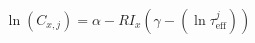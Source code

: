 \documentclass{article}
\begin{document}
\LARGE
\pagestyle{empty}
\[
\ln(C_{x,j}) = \alpha-RI_x\left(\gamma-(\ln \tau_\mathrm{eff}^j)\right)
\]
\end{document}
